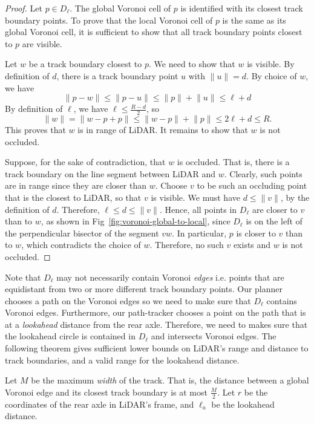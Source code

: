\begin{proof}
Let $p \in D_\ell$.
%
The global Voronoi cell of $p$ is identified with its closest track boundary points.
%
To prove that the local Voronoi cell of $p$ is the same as its global Voronoi cell, it is sufficient to show that all track boundary points closest to $p$ are visible.


Let $w$ be a track boundary closest to $p$.
%
We need to show that $w$ is visible.
%
By definition of $d$, there is a track boundary point $u$ with $\lVert u \rVert = d$.
%
By choice of $w$, we have
$$
\lVert p - w \rVert 
\leq \lVert p - u \rVert 
\leq \lVert p \rVert + \lVert u \rVert \leq \ell + d
$$
%
By definition of $\ell$, we have $\ell \leq \frac{R-d}{2}$, so
$$
\lVert w \rVert = \lVert w - p + p \rVert \leq \lVert w-p \rVert + \lVert p \rVert \leq 2\ell+d \leq R.
$$
%
This proves that $w$ is in range of LiDAR.
%
It remains to show that $w$ is not occluded.

Suppose, for the sake of contradiction, that $w$ is occluded.
%
That is,
there is a track boundary on the line segment between LiDAR and $w$.
%
Clearly, such points are in range since they are closer than $w$.
%
Choose $v$ to be such an occluding point that is the closest to LiDAR, so that $v$ is visible.
%
We must have $d \leq \lVert v \rVert $, by the definition of $d$.
%
Therefore, $\ell \leq d \leq \lVert v \rVert $.
%
Hence, all points in $D_\ell$ are closer to $v$ than to $w$, as shown in Fig~\ref{fig:voronoi-global-to-local}, since $D_\ell$ is on the left of the perpendicular bisector of the segment $vw$. 
%
In particular, $p$ is closer to $v$ than to $w$, which contradicts the choice of $w$.
%
Therefore, no such $v$ exists and $w$ is not occluded.
\end{proof}

Note that $D_\ell$ may not necessarily contain Voronoi \emph{edges} i.e. points that are equidistant from two or more different track boundary points.
%
Our planner chooses a path on the Voronoi edges so we need to make sure that $D_\ell$ contains Voronoi edges.
%
Furthermore, our path-tracker chooses a point on the path that is at a \emph{lookahead} distance from the rear axle.
%
Therefore, we need to makes sure that the lookahead circle is contained in $D_\ell$ and intersects Voronoi edges.
%
The following theorem gives sufficient lower bounds on LiDAR's range and distance to track boundaries, and a valid range for the lookahead distance.


Let $M$ be the maximum \emph{width} of the track.
%
That is, the distance between a global Voronoi edge and its closest track boundary is at most $\frac{M}{2}$.
%
Let $r$ be the coordinates of the rear axle in LiDAR's frame, and $\ell_a$ be the lookahead distance.

